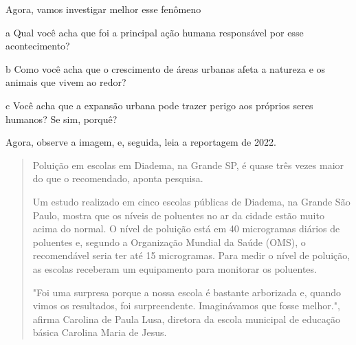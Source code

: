Agora, vamos investigar melhor esse fenômeno

\num{a} Qual você acha que foi a principal ação humana responsável por esse
acontecimento?


\num{b} Como você acha que o crescimento de áreas urbanas afeta a natureza e os
animais que vivem ao redor?


\num{c} Você acha que a expansão urbana pode trazer perigo aos próprios seres
humanos? Se sim, porquê?




Agora, observe a imagem, e, seguida, leia a reportagem de 2022.


\begin{quote}
Poluição em escolas em Diadema, na Grande SP, é quase três vezes maior
do que o recomendado, aponta pesquisa.

Um estudo realizado em cinco escolas públicas de Diadema, na Grande São
Paulo, mostra que os níveis de poluentes no ar da cidade estão muito
acima do normal. O nível de poluição está em 40 microgramas diários de
poluentes e, segundo a Organização Mundial da Saúde (OMS), o
recomendável seria ter até 15 microgramas. Para medir o nível de
poluição, as escolas receberam um equipamento para monitorar os
poluentes.

"Foi uma surpresa porque a nossa escola é bastante arborizada e, quando
vimos os resultados, foi surpreendente. Imaginávamos que fosse melhor.",
afirma Carolina de Paula Lusa, diretora da escola municipal de educação
básica Carolina Maria de Jesus.

\end{quote}

